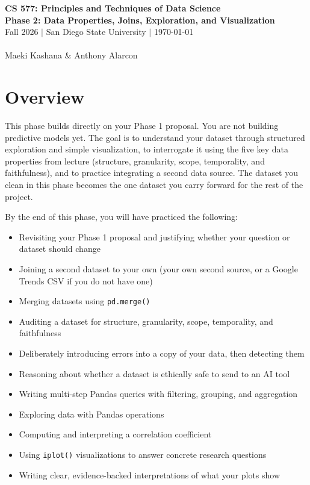 \documentclass[11pt,letterpaper]{article}
\newcommand{\code}[1]{\texttt{#1}}
\begin{document}
\begin{titlepage}
  \thispagestyle{empty}
  \centering
  \vspace*{\fill}
  {\LARGE\bfseries CS 577: Principles and Techniques of Data Science}\\[14pt]
  {\Large\bfseries Phase 2: Data Properties, Joins, Exploration, and Visualization}\\[14pt]
  {\large Fall 2026 $|$ San Diego State University $|$ \today
	\\ \ \\ Maeki Kashana \& Anthony Alarcon}
  \vspace*{\fill}
\end{titlepage}

\clearpage
\tableofcontents
\clearpage
{}

\section{Overview}

This phase builds directly on your Phase 1 proposal. You are not building predictive models yet. The goal is to understand your dataset through structured exploration and simple visualization, to interrogate it using the five key data properties from lecture (structure, granularity, scope, temporality, and faithfulness), and to practice integrating a second data source. The dataset you clean in this phase becomes the one dataset you carry forward for the rest of the project.

By the end of this phase, you will have practiced the following:
\begin{itemize}
  \item Revisiting your Phase 1 proposal and justifying whether your question or dataset should change
  \item Joining a second dataset to your own (your own second source, or a Google Trends CSV if you do not have one)
  \item Merging datasets using \code{pd.merge()}
  \item Auditing a dataset for structure, granularity, scope, temporality, and faithfulness
  \item Deliberately introducing errors into a copy of your data, then detecting them
  \item Reasoning about whether a dataset is ethically safe to send to an AI tool
  \item Writing multi-step Pandas queries with filtering, grouping, and aggregation
  \item Exploring data with Pandas operations
  \item Computing and interpreting a correlation coefficient
  \item Using \code{iplot()} visualizations to answer concrete research questions
  \item Writing clear, evidence-backed interpretations of what your plots show
\end{itemize}
\end{document}
